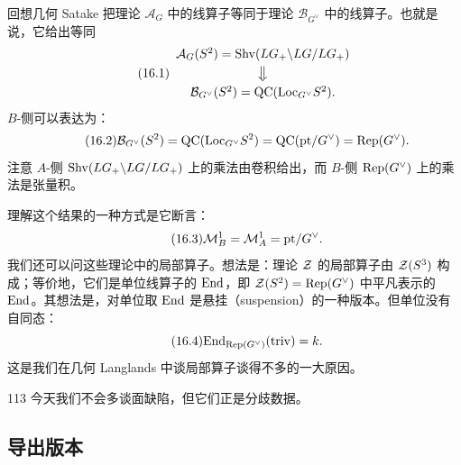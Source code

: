 回想几何 Satake 把理论 $\mathcal{A}_G$ 中的线算子等同于理论 $\mathcal{B}_{G^\vee}$ 中的线算子。也就是说，它给出等同
\begin{equation}\tag{16.1}
\begin{array}{c}
\mathcal{A}_G(S^2)=\mathrm{Shv}(LG_+\backslash LG/LG_+)\\[3pt]
\big\Downarrow\\[3pt]
\mathcal{B}_{G^\vee}(S^2)=\mathrm{QC}(\mathrm{Loc}_{G^\vee}S^2).
\end{array}
\end{equation}
$B$-侧可以表达为：
\begin{equation}\tag{16.2}
\mathcal{B}_{G^\vee}(S^2)=\mathrm{QC}(\mathrm{Loc}_{G^\vee}S^2)=\mathrm{QC}(\mathrm{pt}/G^\vee)=\mathrm{Rep}(G^\vee).
\end{equation}
注意 $A$-侧 $\mathrm{Shv}(LG_+\backslash LG/LG_+)$ 上的乘法由卷积给出，而 $B$-侧 $\mathrm{Rep}(G^\vee)$ 上的乘法是张量积。

理解这个结果的一种方式是它断言：
\begin{equation}\tag{16.3}
\mathcal{M}^1_B=\mathcal{M}^1_A=\mathrm{pt}/G^\vee.
\end{equation}
我们还可以问这些理论中的局部算子。想法是：理论 $\mathcal{Z}$ 的局部算子由 $\mathcal{Z}(S^3)$ 构成；等价地，它们是单位线算子的 $\mathrm{End}$，即 $\mathcal{Z}(S^2)=\mathrm{Rep}(G^\vee)$ 中平凡表示的 $\mathrm{End}$。其想法是，对单位取 $\mathrm{End}$ 是悬挂（suspension）的一种版本。但单位没有自同态：
\begin{equation}\tag{16.4}
\mathrm{End}_{\mathrm{Rep}(G^\vee)}(\mathrm{triv})=k.
\end{equation}
这是我们在几何 Langlands 中谈局部算子谈得不多的一大原因。

\begin{srcrem}{113}
今天我们不会多谈面缺陷，但它们正是分歧数据。
\end{srcrem}

\subsection{导出版本}

